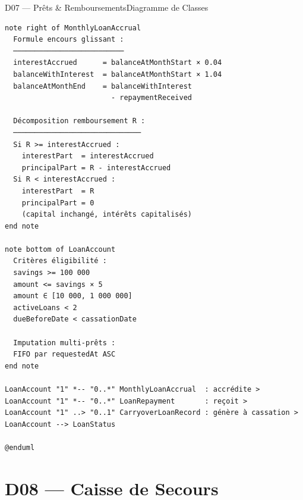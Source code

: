 \documentclass[12pt, a4paper]{report}
\begin{document}
\begin{diagramBox}{D07 — Prêts \& Remboursements}{Diagramme de Classes}
\begin{lstlisting}
note right of MonthlyLoanAccrual
  Formule encours glissant :
  ──────────────────────────
  interestAccrued      = balanceAtMonthStart × 0.04
  balanceWithInterest  = balanceAtMonthStart × 1.04
  balanceAtMonthEnd    = balanceWithInterest
                         - repaymentReceived

  Décomposition remboursement R :
  ──────────────────────────────
  Si R >= interestAccrued :
    interestPart  = interestAccrued
    principalPart = R - interestAccrued
  Si R < interestAccrued :
    interestPart  = R
    principalPart = 0
    (capital inchangé, intérêts capitalisés)
end note

note bottom of LoanAccount
  Critères éligibilité :
  savings >= 100 000
  amount <= savings × 5
  amount ∈ [10 000, 1 000 000]
  activeLoans < 2
  dueBeforeDate < cassationDate

  Imputation multi-prêts :
  FIFO par requestedAt ASC
end note

LoanAccount "1" *-- "0..*" MonthlyLoanAccrual  : accrédite >
LoanAccount "1" *-- "0..*" LoanRepayment       : reçoit >
LoanAccount "1" ..> "0..1" CarryoverLoanRecord : génère à cassation >
LoanAccount --> LoanStatus

@enduml
\end{lstlisting}
\end{diagramBox}

\section{D08 — Caisse de Secours}
\end{document}
